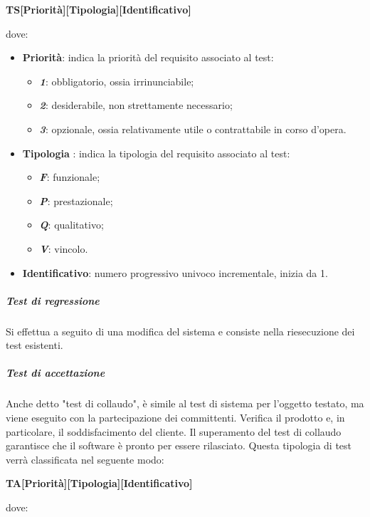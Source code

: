 			\begin{center}
				\textbf{TS[Priorità][Tipologia][Identificativo]}
			\end{center}
			dove:
			\begin{itemize}
				\item \textbf{Priorità}: indica la priorità del requisito associato al test:
				\begin{itemize}
					\item \textbf{\textit{1}}: obbligatorio, ossia irrinunciabile;
					\item \textbf{\textit{2}}: desiderabile, non strettamente necessario;
					\item \textbf{\textit{3}}: opzionale, ossia relativamente utile o contrattabile in corso d'opera.
				\end{itemize}
				\item \textbf{Tipologia} : indica la tipologia del requisito associato al test:
				\begin{itemize}
					\item \textbf{\textit{F}}: funzionale;
					\item \textbf{\textit{P}}: prestazionale;
					\item \textbf{\textit{Q}}: qualitativo;
					\item \textbf{\textit{V}}: vincolo.
				\end{itemize}
				\item \textbf{Identificativo}: numero progressivo univoco incrementale, inizia da 1.
			\end{itemize}
			\subparagraph{Test di regressione}
			Si effettua a seguito di una modifica del sistema e consiste nella riesecuzione dei test esistenti.
			\subparagraph{Test di accettazione}
			Anche detto "test di collaudo", è simile al test di sistema per l’oggetto testato, ma viene eseguito con la partecipazione dei committenti. Verifica il prodotto e, in particolare, il soddisfacimento del cliente. Il superamento del test di collaudo garantisce che il software è pronto per essere rilasciato.
			Questa tipologia di test verrà classificata nel seguente modo:
			\begin{center}
				\textbf{TA[Priorità][Tipologia][Identificativo]}
			\end{center}
			dove:
